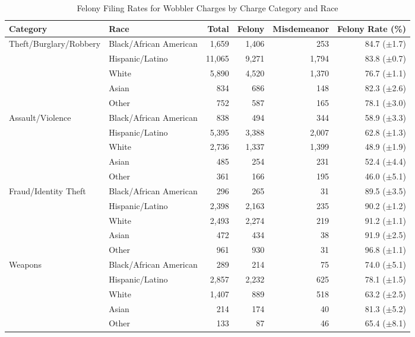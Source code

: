 \begin{table}
\caption{Felony Filing Rates for Wobbler Charges by Charge Category and Race}
\label{tab:wobbler_by_category}
\begin{tabular}{llrrrr}
\toprule
Category & Race & Total & Felony & Misdemeanor & Felony Rate (\%) \\
\midrule
Theft/Burglary/Robbery & Black/African American & 1,659 & 1,406 & 253 & 84.7 ({\scriptsize $\pm$1.7}) \\
 & Hispanic/Latino & 11,065 & 9,271 & 1,794 & 83.8 ({\scriptsize $\pm$0.7}) \\
 & White & 5,890 & 4,520 & 1,370 & 76.7 ({\scriptsize $\pm$1.1}) \\
 & Asian & 834 & 686 & 148 & 82.3 ({\scriptsize $\pm$2.6}) \\
 & Other & 752 & 587 & 165 & 78.1 ({\scriptsize $\pm$3.0}) \\
\addlinespace
\midrule
Assault/Violence & Black/African American & 838 & 494 & 344 & 58.9 ({\scriptsize $\pm$3.3}) \\
 & Hispanic/Latino & 5,395 & 3,388 & 2,007 & 62.8 ({\scriptsize $\pm$1.3}) \\
 & White & 2,736 & 1,337 & 1,399 & 48.9 ({\scriptsize $\pm$1.9}) \\
 & Asian & 485 & 254 & 231 & 52.4 ({\scriptsize $\pm$4.4}) \\
 & Other & 361 & 166 & 195 & 46.0 ({\scriptsize $\pm$5.1}) \\
\addlinespace
\midrule
Fraud/Identity Theft & Black/African American & 296 & 265 & 31 & 89.5 ({\scriptsize $\pm$3.5}) \\
 & Hispanic/Latino & 2,398 & 2,163 & 235 & 90.2 ({\scriptsize $\pm$1.2}) \\
 & White & 2,493 & 2,274 & 219 & 91.2 ({\scriptsize $\pm$1.1}) \\
 & Asian & 472 & 434 & 38 & 91.9 ({\scriptsize $\pm$2.5}) \\
 & Other & 961 & 930 & 31 & 96.8 ({\scriptsize $\pm$1.1}) \\
\addlinespace
\midrule
Weapons & Black/African American & 289 & 214 & 75 & 74.0 ({\scriptsize $\pm$5.1}) \\
 & Hispanic/Latino & 2,857 & 2,232 & 625 & 78.1 ({\scriptsize $\pm$1.5}) \\
 & White & 1,407 & 889 & 518 & 63.2 ({\scriptsize $\pm$2.5}) \\
 & Asian & 214 & 174 & 40 & 81.3 ({\scriptsize $\pm$5.2}) \\
 & Other & 133 & 87 & 46 & 65.4 ({\scriptsize $\pm$8.1}) \\

\end{tabular}
\end{table}
